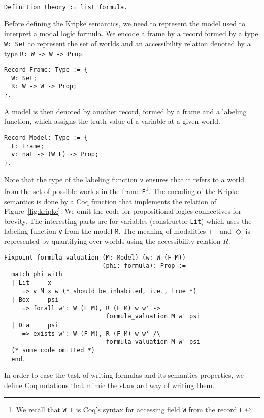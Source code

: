 \documentclass[sigconf]{acmart}
\begin{document}
\begin{verbatim}
Definition theory := list formula.
\end{verbatim}

Before defining the Kripke semantics, we need to represent the model used to
interpret a modal logic formula. We encode a frame by a record formed by
a type \texttt{W: Set} to represent the set of worlds and an
accessibility relation denoted by a type \texttt{R: W -> W -> Prop}.
\begin{verbatim}
Record Frame: Type := {
  W: Set;
  R: W -> W -> Prop;
}.
\end{verbatim}
A model is then denoted by another record, formed by a frame and a labeling function,
which assigns the truth value of a variable at a given world.
\begin{verbatim}
Record Model: Type := {
  F: Frame; 
  v: nat -> (W F) -> Prop; 
}.
\end{verbatim}
Note that the type of the labeling function \texttt{v} ensures that it
refers to a world from the set of possible worlds in the frame
\texttt{F}\footnote{We recall that \texttt{W F} is Coq's syntax for
accessing field \texttt{W} from the record \texttt{F}.}. The encoding of the Kripke semantics is done by a Coq function
that implements the relation of Figure~\ref{fig:kripke}. We omit the code
for propositional logics connectives for brevity. The interesting parts are for
variables (constructor \texttt{Lit}) which uses the labeling function
\texttt{v} from the model \texttt{M}. The meaning of
modalities $\Box$ and $\Diamond$ is represented by quantifying over worlds
using the accessibility relation $R$. 
\begin{verbatim}
Fixpoint formula_valuation (M: Model) (w: W (F M))
                           (phi: formula): Prop :=
  match phi with
  | Lit     x
     => v M x w (* should be inhabited, i.e., true *)
  | Box     psi
     => forall w': W (F M), R (F M) w w' ->
                            formula_valuation M w' psi
  | Dia     psi
     => exists w': W (F M), R (F M) w w' /\
                            formula_valuation M w' psi
  (* some code omitted *)
  end.
\end{verbatim}
In order to ease the task of writing formulas and its semantics properties, we
define Coq notations that mimic the standard way of writing them.
\end{document}
